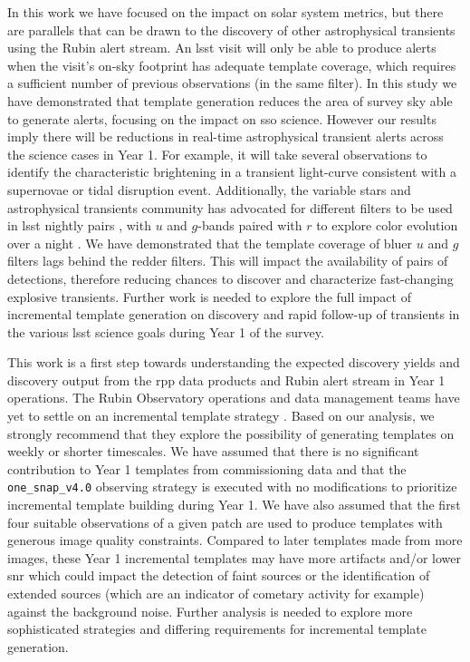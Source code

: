 \documentclass[preprintm,linenumbers]{aastex631}
\newcommand{\baseline}{\texttt{one\_snap\_v4.0}\xspace}
\begin{document}
		In this work we have focused on the impact on solar system metrics, but there are parallels that can be drawn to the discovery of other astrophysical transients using the Rubin alert stream. 
  An \gls*{lsst} visit will only be able to produce alerts when the visit's on-sky footprint has adequate template coverage, which requires a sufficient number of previous observations (in the same filter).
  In this study we have demonstrated that template generation reduces the area of survey sky able to generate alerts, %
  focusing on the impact on \gls*{sso} science.
  However our results imply there will be reductions in real-time astrophysical transient alerts across the science cases in Year 1.
  For example, it will take several observations to identify the characteristic brightening in a transient light-curve consistent with a supernovae or tidal disruption event. 
  Additionally, the variable stars and astrophysical transients community has advocated for different filters to be used in \gls*{lsst} nightly pairs \citep{2019PASPpresto}, with $u$ and $g$-bands paired with $r$ to explore color evolution over a night \citep{SCOC_Report_1, SCOC_Report_2}. 
  We have demonstrated that the template coverage of bluer $u$ and $g$ filters lags behind the redder filters.
  This will impact the availability of pairs of detections, therefore reducing chances to discover and characterize fast-changing explosive transients. 
  Further work is needed to explore the full impact of incremental template generation on discovery and rapid follow-up of transients in the various \gls*{lsst} science goals during Year 1 of the survey. 
		
		This work is a first step towards understanding the expected discovery yields and discovery output from the \gls*{rpp} data products and Rubin alert stream in Year 1 operations. 
		The Rubin Observatory operations and data management teams have yet to settle on an incremental template strategy \citep{DMTN-107,RTN-011}. 
		Based on our analysis, we strongly recommend that they explore the possibility of generating templates on weekly or shorter timescales.  
		We have assumed that there is no significant contribution to Year 1 templates from commissioning data and that the \baseline observing strategy is executed with no modifications to prioritize incremental template building during Year 1. 
  We have also assumed that the first four suitable observations of a given patch are used to produce templates with generous image quality constraints. 
  Compared to later templates made from more images, these Year 1 incremental templates may have more artifacts and/or lower \gls*{snr} which could impact the detection of faint sources or the identification of extended sources (which are an indicator of cometary activity for example) against the background noise.
		Further analysis is needed to explore more sophisticated strategies and differing requirements for incremental template generation. 
        
\end{document}
